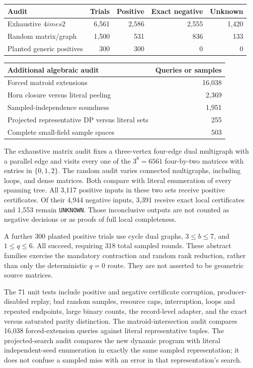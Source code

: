 \documentclass[11pt,letterpaper]{article}
\theoremstyle{definition}
\newcommand{\Unk}{\texttt{UNKNOWN}}
\begin{document}
\begin{center}\small
\begin{tabular}{lrrrr}\toprule
Audit & Trials & Positive & Exact negative & Unknown\\\midrule
Exhaustive $4	imes2$ & 6,561 & 2,586 & 2,555 & 1,420\\
Random matrix/graph & 1,500 & 531 & 836 & 133\\
Planted generic positives & 300 & 300 & 0 & 0\\
\bottomrule\end{tabular}
\end{center}
\begin{center}\small\begin{tabular}{lr}\toprule
Additional algebraic audit & Queries or samples\\\midrule
Forced matroid extensions & 16,038\\
Horn closure versus literal peeling & 2,369\\
Sampled-independence soundness & 1,951\\
Projected representative DP versus literal sets & 255\\
Complete small-field sample spaces & 503\\
\bottomrule\end{tabular}\end{center}

The exhaustive matrix audit fixes a three-vertex four-edge dual multigraph
with a parallel edge and visits every one of the $3^8=6561$ four-by-two
matrices with entries in $\{0,1,2\}$. The random audit varies connected
multigraphs, including loops, and dense matrices. Both compare with literal
enumeration of every spanning tree. All 3,117 positive inputs in these two
sets receive positive certificates. Of their 4,944 negative inputs, 3,391
receive exact local certificates and 1,553 remain \Unk. Those inconclusive
outputs are not counted as negative decisions or as proofs of full local
completeness.

A further 300 planted positive trials use cycle dual graphs, $3\leq b\leq7$,
and $1\leq q\leq6$. All succeed, requiring 318 total sampled rounds.
These abstract families exercise the mandatory contraction and random rank
reduction, rather than only the deterministic $q=0$ route. They are not
asserted to be geometric source matrices.

The 71 unit tests include positive and negative certificate corruption,
producer-disabled replay, bad random samples, resource caps, interruption,
loops and repeated endpoints, large binary counts, the record-level adapter,
and the exact versus saturated parity distinction. The matroid-intersection
audit compares 16,038 forced-extension queries against literal representative
tuples. The projected-search audit compares the new dynamic program with
literal independent-seed enumeration in exactly the same sampled
representation; it does not confuse a sampled miss with an error in that
representation's search.
\end{document}
